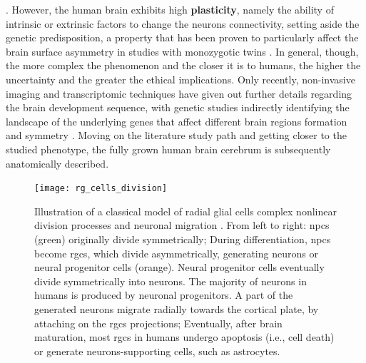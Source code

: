 \cite{Schmitz2019,Cara2022}. However, the human brain exhibits high \textbf{plasticity}, namely the ability of intrinsic or extrinsic factors to change the neurons connectivity, setting aside the genetic predisposition, a property that has been proven to particularly affect the brain surface asymmetry in studies with monozygotic twins \cite{White2002,Manzano2018}. In general, though, the more complex the phenomenon and the closer it is to humans, the higher the uncertainty and the greater the ethical implications. Only recently, non-invasive imaging and transcriptomic techniques have given out further details regarding the brain development sequence, with genetic studies indirectly identifying the landscape of the underlying genes that affect different brain regions formation and symmetry \cite{Cara2022}. Moving on the literature study path and getting closer to the studied phenotype, the fully grown human brain cerebrum is subsequently anatomically described.

\begin{figure}[H]
	\centering
	\texttt{[image: rg\_cells\_division]}\\
	\caption[A classical model of radial glial cells division processes \cite{Rakic2009}]{Illustration of a classical model of radial glial cells complex nonlinear division processes and neuronal migration \cite{Rakic2009}. From left to right: \acsp{npc} (green) originally divide symmetrically; During differentiation, \acsp{npc} become \acsp{rgc}, which divide asymmetrically, generating neurons or neural progenitor cells (orange). Neural progenitor cells eventually divide symmetrically into neurons. The majority of neurons in humans is produced by neuronal progenitors. A part of the generated neurons migrate radially towards the cortical plate, by attaching on the \acsp{rgc} projections; Eventually, after brain maturation, most \acsp{rgc} in humans undergo apoptosis (i.e., cell death) or generate neurons-supporting cells, such as astrocytes.}
	\label{fig:rgc}
\end{figure}



